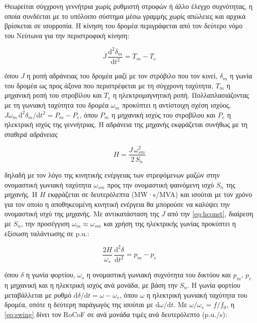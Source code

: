 Θεωρείται σύγχρονη γεννήτρια χωρίς ρυθμιστή στροφών ή άλλο έλεγχο συχνότητας, η οποία
συνδέεται με το υπόλοιπο σύστημα μέσω γραμμής χωρίς απώλειες και αρχικά βρίσκεται σε
ισορροπία. Η κίνηση του δρομέα περιγράφεται από τον δεύτερο νόμο του Νεύτωνα για την
περιστροφική κίνηση:

\begin{equation}
J\,\frac{\mathrm{d}^2\delta_m}{\mathrm{d}t^2} = T_m - T_e
\label{eq:swing-torque}
\end{equation}

όπου $J$ η ροπή αδράνειας του δρομέα μαζί με τον στρόβιλο που τον κινεί, $\delta_m$ η γωνία
του δρομέα ως προς άξονα που περιστρέφεται με τη σύγχρονη ταχύτητα, $T_m$ η μηχανική ροπή του
στροβίλου και $T_e$ η ηλεκτρομαγνητική ροπή. Πολλαπλασιάζοντας με τη γωνιακή ταχύτητα του
δρομέα $\omega_m$ προκύπτει η αντίστοιχη σχέση ισχύος,
$J\omega_m\,\mathrm{d}^2\delta_m/\mathrm{d}t^2 = P_m - P_e$, όπου $P_m$ η μηχανική ισχύς του
στροβίλου και $P_e$ η ηλεκτρική ισχύς της γεννήτριας. Η αδράνεια της μηχανής εκφράζεται
συνήθως με τη \emph{σταθερά αδράνειας}

\begin{equation}
H = \frac{J\,\omega_{sm}^2}{2\,S_n}
\label{eq:hconst}
\end{equation}

δηλαδή με τον λόγο της κινητικής ενέργειας των στρεφόμενων μαζών στην ονομαστική γωνιακή
ταχύτητα $\omega_{sm}$ προς την ονομαστική φαινόμενη ισχύ $S_n$ της μηχανής. Η $H$ εκφράζεται
σε δευτερόλεπτα (MW·s/MVA) και ισούται με τον χρόνο για τον οποίο η αποθηκευμένη κινητική
ενέργεια θα μπορούσε να καλύψει την ονομαστική ισχύ της μηχανής. Με αντικατάσταση της $J$ από
την \eqref{eq:hconst}, διαίρεση με $S_n$, την προσέγγιση $\omega_m \approx \omega_{sm}$ και χρήση της ηλεκτρικής γωνίας προκύπτει η εξίσωση ταλάντωσης σε p.u.:

\begin{equation}
\frac{2H}{\omega_s}\,\frac{\mathrm{d}^2\delta}{\mathrm{d}t^2} = p_m - p_e
\label{eq:swing}
\end{equation}

όπου $\delta$ η γωνία φορτίου, $\omega_s$ η ονομαστική γωνιακή συχνότητα του δικτύου και
$p_m$, $p_e$ η μηχανική και η ηλεκτρική ισχύς ανά μονάδα, με βάση την $S_n$. Η γωνία φορτίου
μεταβάλλεται με ρυθμό $\mathrm{d}\delta/\mathrm{d}t = \omega - \omega_s$, όπου $\omega$ η
ηλεκτρική γωνιακή ταχύτητα του δρομέα, οπότε η δεύτερη παράγωγός της ισούται με
$\mathrm{d}\omega/\mathrm{d}t$. Με $\omega/\omega_s = f/f_0$, η \eqref{eq:swing} δίνει τον
RoCoF σε ανά μονάδα τιμές ανά δευτερόλεπτο (p.u./s):

